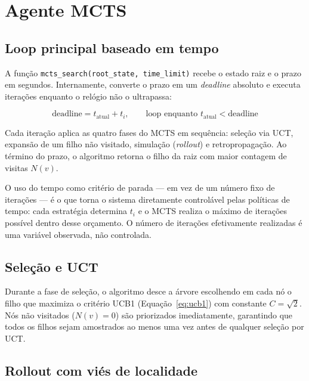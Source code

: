 \documentclass[cic,tc]{iiufrgs}
\begin{document}
\section{Agente MCTS}
\label{sec:impl_mcts}

\subsection{Loop principal baseado em tempo}
\label{sec:impl_mcts_loop}

A função \texttt{mcts\_search(root\_state, time\_limit)} recebe o estado raiz e o prazo em segundos. Internamente, converte o prazo em um \emph{deadline} absoluto e executa iterações enquanto o relógio não o ultrapassa:

\begin{equation}
    \text{deadline} = t_{\text{atual}} + t_i, \qquad
    \text{loop enquanto } t_{\text{atual}} < \text{deadline}
\label{eq:mcts_deadline}
\end{equation}

Cada iteração aplica as quatro fases do MCTS em sequência: seleção via UCT, expansão de um filho não visitado, simulação (\emph{rollout}) e retropropagação. Ao término do prazo, o algoritmo retorna o filho da raiz com maior contagem de visitas $N(v)$.

O uso do tempo como critério de parada — em vez de um número fixo de iterações — é o que torna o sistema diretamente controlável pelas políticas de tempo: cada estratégia determina $t_i$ e o MCTS realiza o máximo de iterações possível dentro desse orçamento. O número de iterações efetivamente realizadas é uma variável observada, não controlada.

\subsection{Seleção e UCT}
\label{sec:impl_uct}

Durante a fase de seleção, o algoritmo desce a árvore escolhendo em cada nó o filho que maximiza o critério UCB1 (Equação~\ref{eq:ucb1}) com constante $C = \sqrt{2}$. Nós não visitados ($N(v) = 0$) são priorizados imediatamente, garantindo que todos os filhos sejam amostrados ao menos uma vez antes de qualquer seleção por UCT.

\subsection{Rollout com viés de localidade}
\label{sec:impl_rollout}
\end{document}
